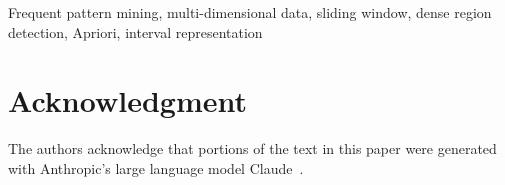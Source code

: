 \documentclass[conference]{IEEEtran}
\begin{document}
\begin{IEEEkeywords}
Frequent pattern mining, multi-dimensional data, sliding window,
dense region detection, Apriori, interval representation
\end{IEEEkeywords}








\section*{Acknowledgment}
The authors acknowledge that portions of the text in
this paper were generated with Anthropic's large language
model Claude~\cite{claude2025}.

\newpage



\clearpage
\appendices

\end{document}
